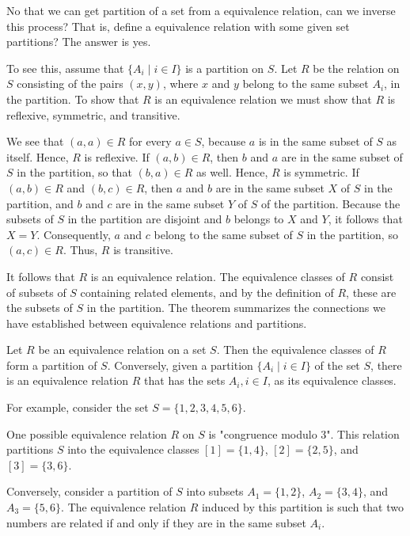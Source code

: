 No that we can get partition of a set from a equivalence relation, can we inverse this process? That is, define a equivalence relation with some given set partitions? The answer is yes. 

To see this, assume that \( \{A_i \mid i \in I\} \) is a partition on \( S \). Let \( R \) be the relation on \( S \) consisting of the pairs \( (x, y) \), where \( x \) and \( y \) belong to the same subset \( A_i \), in the partition. To show that \( R \) is an equivalence relation we must show that \( R \) is reflexive, symmetric, and transitive.

We see that \( (a, a) \in R \) for every \( a \in S \), because \( a \) is in the same subset of \( S \) as itself. Hence, \( R \) is reflexive. If \( (a, b) \in R \), then \( b \) and \( a \) are in the same subset of \( S \) in the partition, so that \( (b, a) \in R \) as well. Hence, \( R \) is symmetric. If \( (a, b) \in R \) and \( (b, c) \in R \), then \( a \) and \( b \) are in the same subset \( X \) of \( S \) in the partition, and \( b \) and \( c \) are in the same subset \( Y \) of \( S \) of the partition. Because the subsets of \( S \) in the partition are disjoint and \( b \) belongs to \( X \) and \( Y \), it follows that \( X = Y \). Consequently, \( a \) and \( c \) belong to the same subset of \( S \) in the partition, so \( (a, c) \in R \). Thus, \( R \) is transitive.

It follows that \( R \) is an equivalence relation. The equivalence classes of \( R \) consist of subsets of \( S \) containing related elements, and by the definition of \( R \), these are the subsets of \( S \) in the partition. The theorem summarizes the connections we have established between equivalence relations and partitions.
\begin{theorem}
	Let \( R \) be an equivalence relation on a set \( S \). Then the equivalence classes of \( R \) form a partition of \( S \). Conversely, given a partition \( \{A_i \mid i \in I\} \) of the set \( S \), there is an equivalence relation \( R \) that has the sets \( A_i, i \in I \), as its equivalence classes.
\end{theorem}

\begin{example}
	For example, consider the set \( S = \{1, 2, 3, 4, 5, 6\} \). 
	
	One possible equivalence relation \( R \) on \( S \) is "congruence modulo 3". This relation partitions \( S \) into the equivalence classes \( [1] = \{1, 4\} \), \( [2] = \{2, 5\} \), and \( [3] = \{3, 6\} \).
	
	Conversely, consider a partition of \( S \) into subsets \( A_1 = \{1, 2\} \), \( A_2 = \{3, 4\} \), and \( A_3 = \{5, 6\} \). The equivalence relation \( R \) induced by this partition is such that two numbers are related if and only if they are in the same subset \( A_i \).
\end{example}


